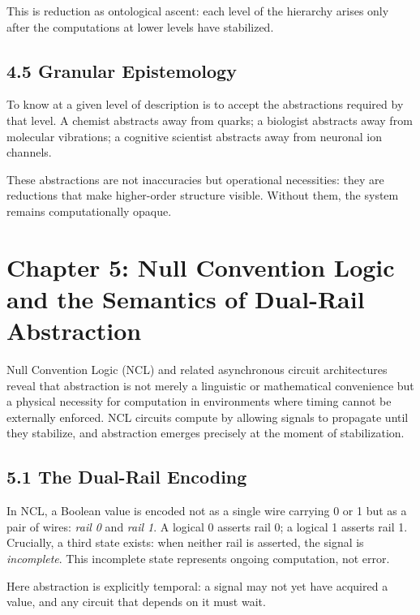 \documentclass[11pt,letterpaper]{article}
\begin{document}
This is reduction as ontological ascent: each level of the hierarchy arises only after the computations at lower levels have stabilized.

\subsection{4.5 Granular Epistemology}

To know at a given level of description is to accept the abstractions required by that level. A chemist abstracts away from quarks; a biologist abstracts away from molecular vibrations; a cognitive scientist abstracts away from neuronal ion channels.

These abstractions are not inaccuracies but operational necessities: they are reductions that make higher-order structure visible. Without them, the system remains computationally opaque.

\newpage

\section{Chapter 5: Null Convention Logic and the Semantics of Dual-Rail Abstraction}

Null Convention Logic (NCL) and related asynchronous circuit architectures reveal that abstraction is not merely a linguistic or mathematical convenience but a physical necessity for computation in environments where timing cannot be externally enforced. NCL circuits compute by allowing signals to propagate until they stabilize, and abstraction emerges precisely at the moment of stabilization.

\subsection{5.1 The Dual-Rail Encoding}

In NCL, a Boolean value is encoded not as a single wire carrying 0 or 1 but as a pair of wires: \emph{rail 0} and \emph{rail 1}. A logical 0 asserts rail 0; a logical 1 asserts rail 1. Crucially, a third state exists: when neither rail is asserted, the signal is \emph{incomplete}. This incomplete state represents ongoing computation, not error.

Here abstraction is explicitly temporal: a signal may not yet have acquired a value, and any circuit that depends on it must wait.
\end{document}
